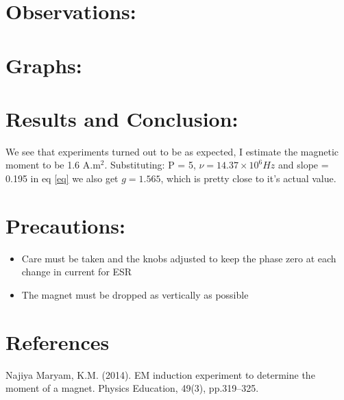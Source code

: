 \begin{Abstract:}
\section{Observations:}
\section{Graphs:}
\section{Results and Conclusion:}
We see that experiments turned out to be as expected, I estimate the magnetic moment to be 1.6 A.m$^2$. Substituting: P = 5, $\nu = 14.37 \times 10^6 Hz$ and slope = 0.195 in eq \ref{eq} we also get $g = 1.565$, which is pretty close to it's actual value.
\section{Precautions:}
\begin{itemize}
	\item Care must be taken and the knobs adjusted to keep the phase zero at each change in current for ESR
	\item The magnet must be dropped as vertically as possible
\end{itemize}
\section{References}
Najiya Maryam, K.M. (2014). EM induction experiment to determine the moment of a magnet. Physics Education, 49(3), pp.319–325.



\end{Abstract:}
